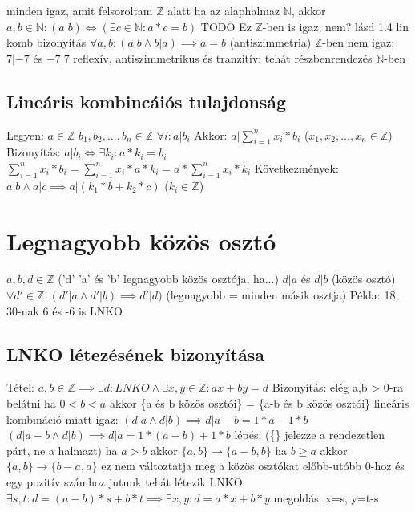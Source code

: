 \documentclass[12pt,a4paper]{article}
\begin{document}
\begin{outline}
	\1 minden igaz, amit felsoroltam $\mathbb{Z}$ alatt
	\1 ha az alaphalmaz $\mathbb{N}$, akkor
	$a,b \in \mathbb{N}: (a|b) \Leftrightarrow (\exists c \in \mathbb{N}: a*c=b)$
		\2 TODO Ez $\mathbb{Z}$-ben is igaz, nem? lásd 1.4 lin komb bizonyítás
	\1 $\forall a,b: (a|b \wedge b|a) \implies a=b$ (antiszimmetria)
		\2 $\mathbb{Z}$-ben nem igaz: $7|-7$ és $-7|7$
	\1 reflexív, antiszimmetrikus és tranzitív: tehát részbenrendezés $\mathbb{N}$-ben
\end{outline}

\pagebreak

\subsection{Lineáris kombincáiós tulajdonság}

\begin{outline}
	\1 Legyen:
		\2 $a\in \mathbb{Z}$
		\2 $b_1, b_2, ..., b_n \in \mathbb{Z}$
		\2 $\forall i: a|b_i$
	\1 Akkor:
		\2 $a| \sum_{i=1}^{n} x_i*b_i$ ($x_1,x_2, ..., x_n \in \mathbb{Z}$)
	\1 Bizonyítás:
		\2 $a|b_i \Leftrightarrow \exists k_i : a*k_i = b_i$
		\2 $\sum_{i=1}^{n}x_i*b_i = \sum_{i=1}^{n}x_i*a*k_i = a * \sum_{i=1}^{n}x_i*k_i$
	\1 Következmények:
		\2 $a|b \wedge a|c \implies a|(k_1*b+k_2*c)$ ($k_i \in \mathbb{Z}$)
\end{outline}

\pagebreak

\section{Legnagyobb közös osztó}

\begin{outline}
	\1 $a,b,d \in \mathbb{Z}$ ('d' 'a' és 'b' legnagyobb közös osztója, ha...)
	\1 $d|a$ és $d|b$ (közös osztó)
	\1 $\forall d' \in \mathbb{Z}: (d'|a \wedge d'|b) \implies d'|d)$ (legnagyobb = minden másik osztja)
	\1 Példa: 18, 30-nak 6 és -6 is LNKO
\end{outline}

\subsection{LNKO létezésének bizonyítása}

\begin{outline}
	\1 Tétel: $a,b \in \mathbb{Z} \implies \exists d:LNKO \wedge \exists x,y \in \mathbb{Z}:
ax+by=d$
	\1 Bizonyítás:
		\2 elég a,b > 0-ra belátni
		\2 ha $0<b<a$ akkor \{a és b közös osztói\} = \{a-b és b közös osztói\}
			\3 lineáris kombináció miatt igaz:
			\3 $(d|a \wedge d|b) \implies d|a-b = 1*a-1*b$
			\3 $(d|a-b \wedge d|b) \implies d|a = 1*(a-b)+1*b$
		\2 lépés: (\{\} jelezze a rendezetlen párt, ne a halmazt)
			\3 ha $a>b$ akkor $\{a,b\} \to \{a-b, b\}$
			\3 ha $b \ge a$ akkor $\{a,b\} \to \{b-a, a\}$
			\3 ez nem változtatja meg a közös osztókat
		\2 előbb-utóbb 0-hoz és egy pozitív számhoz jutunk
		\2 tehát létezik LNKO
		\2 $\exists s,t: d=(a-b)*s+b*t \implies \exists x,y:d=a*x+b*y$
			\3 megoldás: x=s, y=t-s
\end{outline}
\end{document}
